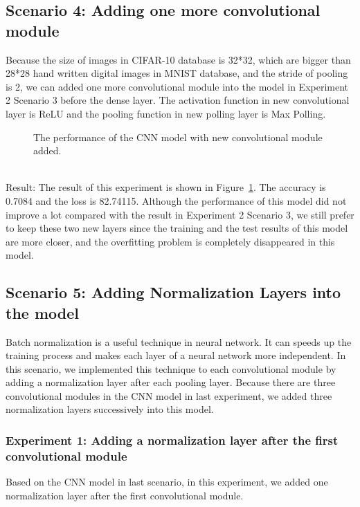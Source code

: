 \documentclass[]{UCD_CS_FYP_Report}
\begin{document}
\subsection{Scenario 4: Adding one more convolutional module}
Because the size of images in CIFAR-10 database is 32*32, which are bigger than 28*28 hand written digital images in MNIST database, and the stride of pooling is 2, we can added one more convolutional module into the model in Experiment 2 Scenario 3 before the dense layer. The activation function in new convolutional layer is ReLU and the pooling function in new polling layer is Max Polling.
\begin{figure}[h]
\centering
\fboxsep 2mm
\caption{\label{fig:CIFAR_10_CNN_S4E1} The performance of the CNN model with new convolutional module added.}
\end{figure}
\\Result: The result of this experiment is shown in Figure~\ref{fig:CIFAR_10_CNN_S4E1}. The accuracy is 0.7084 and the loss is 82.74115. Although the performance of this model did not improve a lot compared with the result in Experiment 2 Scenario 3, we still prefer to keep these two new layers since the training and the test results of this model are more closer, and the overfitting problem is completely disappeared in this model.
\subsection{Scenario 5: Adding Normalization Layers into the model}
Batch normalization is a useful technique in neural network. It can speeds up the training process and makes each layer of a neural network more independent. In this scenario, we implemented this technique to each convolutional module by adding a normalization layer after each pooling layer. Because there are three convolutional modules in the CNN model in last experiment, we added three normalization layers successively into this model. 
%
\subsubsection{Experiment 1: Adding a normalization layer after the first convolutional module}
Based on the CNN model in last scenario, in this experiment, we added one normalization layer after the first convolutional module.
\end{document}
